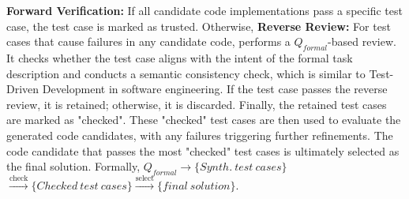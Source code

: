 \noindent \textbf{Forward Verification:} If all candidate code implementations pass a specific test case, the test case is marked as trusted. Otherwise, \textbf{Reverse Review:} For test cases that cause failures in any candidate code, \tool performs a $Q_{formal}$-based review. It checks whether the test case aligns with the intent of the formal task description and conducts a semantic consistency check, which is similar to Test-Driven Development \cite{Erdogmus2010TestDrivenD} in software engineering. If the test case passes the reverse review, it is retained; otherwise, it is discarded. Finally, the retained test cases are marked as "checked". These "checked" test cases are then used to evaluate the generated code candidates, with any failures triggering further refinements. The code candidate that passes the most "checked" test cases is ultimately selected as the final solution. Formally,
$Q_{formal} \to \{Synth. \ test \ cases\} $$\overset{\text{check}} \to \{Checked\ test\ cases\} \overset{\text{select}} \to \{final \ solution\}$.

